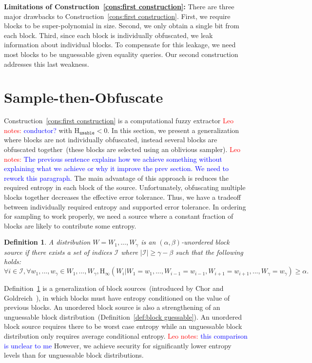 \documentclass[11pt]{article}
\newcommand{\defref}[1]{\mbox{Definition~\ref{#1}}}
\newcommand{\consref}[1]{\mbox{Construction~\ref{#1}}}
\newcommand{\Hoo}{\mathrm{H}_\infty}
\newcommand{\Huse}{\mathrm{H}_{\mathtt{usable}}}
\newtheorem{definition}[theorem]{Definition}
\newcommand{\authnote}[2]{{\textcolor{red}{\textsf{#1 notes: }\textcolor{blue}{ #2}}\marginpar{\textcolor{red}{\textbf{!!!!!}}}}}
\newcommand{\authnote}[2]{}
\newcommand{\lnote}[1]{{\authnote{Leo}{#1}}}
\begin{document}
\textbf{Limitations of \consref{cons:first construction}:}  There are three major drawbacks to \consref{cons:first construction}.   First, we require blocks to be super-polynomial in size.  Second, we only obtain a single bit from each block.  Third, since each block is individually obfuscated, we leak information about individual blocks.  To compensate for this leakage, we need most blocks to be unguessable given equality queries.  Our second construction addresses this last weakness.

\section{Sample-then-Obfuscate}
\label{sec:sampling}
\consref{cons:first construction} is a computational fuzzy extractor \lnote{conductor?} with $\Huse<0$.  In this section, we present a generalization where blocks are not individually obfuscated, instead several blocks are obfuscated together~(these blocks are selected using an oblivious sampler). \lnote{The previous sentence explains how we achieve something without explaining what we achieve or why it improve the prev section. We need to rework this paragraph.} The main advantage of this approach is reduces the required entropy in each block of the source.  Unfortunately, obfuscating multiple blocks together decreases the effective error tolerance.  Thus, we have a tradeoff between individually required entropy and supported error tolerance.  In ordering for sampling to work properly, we need a source where a constant fraction of blocks are likely to contribute some entropy.

\begin{definition}
\label{def:unordered source}
A distribution $W = W_1,..., W_\gamma$ is an $(\alpha, \beta)$-unordered block source if there exists a set of indices $\mathcal{I}$ where $|\mathcal{I}| \geq \gamma - \beta$ such that the following holds:
\[
\forall i\in \mathcal{I}, \forall w_1,..., w_\gamma \in W_1,..., W_\gamma, \Hoo(W_i | W_1 = w_1,..., W_{i-1}=w_{i-1}, W_{i+1}=w_{i+1},..., W_\gamma = w_\gamma) \geq \alpha.
\]
\end{definition}

\defref{def:unordered source} is a generalization of block sources~(introduced by Chor and Goldreich~\cite{DBLP:journals/siamcomp/ChorG88}), in which blocks must have entropy conditioned on the value of previous blocks.  An unordered block source is also a strengthening of an unguessable block distribution~(\defref{def:block guessable}).  An unordered block source requires there to be worst case entropy while an unguessable block distribution only requires average conditional entropy. \lnote{this comparison is unclear to me}  However, we achieve security for significantly lower entropy levels than for unguessable block distributions.
\end{document}
